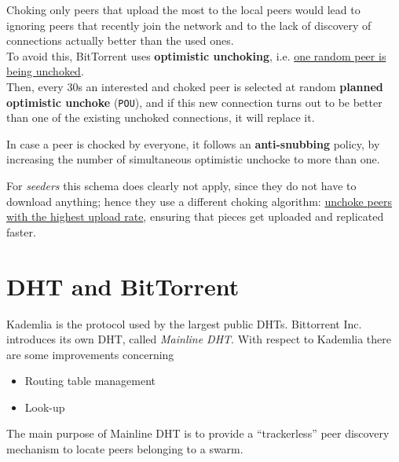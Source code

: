 
Choking only peers that upload the most to the local peers would lead to ignoring peers that recently join the network
and to the lack of discovery of connections actually better than the used ones.\\
To avoid this, BitTorrent uses \textbf{optimistic unchoking}, i.e. \ul{one random peer is being unchoked}.\\
Then, every 30s an interested and choked peer is selected at random \textbf{planned optimistic unchoke} (\texttt{POU}), and if this new connection turns out to be better than one of the existing
unchoked connections, it will replace it.

In case a peer is chocked by everyone, it follows an \textbf{anti-snubbing} policy, by increasing the number of simultaneous optimistic
unchocke to more than one.

For \textit{seeders} this schema does clearly not apply, since they do not have to download anything; hence they use a different choking algorithm:
\ul{unchoke peers with the highest upload rate}, ensuring that pieces get uploaded and replicated faster.

\section{DHT and BitTorrent}
Kademlia is the protocol used by the largest public DHTs.
Bittorrent Inc. introduces its own DHT, called \textit{Mainline DHT}.
With respect to Kademlia there are some improvements concerning 
\begin{itemize}
   \item Routing table management
   \item Look-up
\end{itemize}

The main purpose of Mainline DHT is to provide a “trackerless” peer discovery mechanism to locate peers belonging to a swarm.
